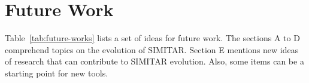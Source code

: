 \chapter{Future Work}\label{ch:future-work}


Table~\ref{tab:future-works} lists a set of ideas for future work. The sections A to D comprehend topics on the evolution of SIMITAR. Section E mentions new ideas of research that can contribute to SIMITAR evolution. Also, some items can be a starting point for new tools.


